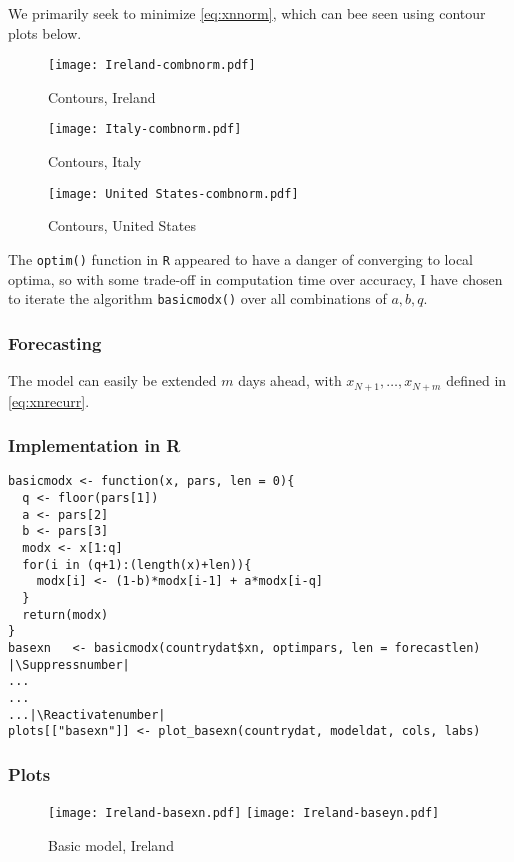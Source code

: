 We primarily seek to minimize \ref{eq:xnnorm}, which can bee seen using contour plots below.

\begin{figure}[H]
  \texttt{[image: Ireland-combnorm.pdf]} \label{fig:ireland-combnorm}
\caption{Contours, Ireland}
\endminipage\hfill
{}
  \texttt{[image: Italy-combnorm.pdf]} \label{fig:italy-combnorm}
\caption{Contours, Italy}
\endminipage\hfill
{}
  \texttt{[image: United States-combnorm.pdf]} \label{fig:usa-combnorm}
\caption{Contours, United States}
\endminipage\hfill
\end{figure}

The \verb|optim()| function in \verb|R| appeared to have a danger of converging to local optima, so with some trade-off in computation time over accuracy, I have chosen to iterate the algorithm \verb|basicmodx()| over all combinations of $a,b,q$.

\subsubsection{Forecasting}

The model can easily be extended $m$ days ahead, with $x_{N+1},\dots,x_{N+m}$ defined in  \ref{eq:xnrecurr}.

\subsubsection{Implementation in R}

\begin{lstlisting}[breaklines = true, escapeinside=||, tabsize = 4, caption = {Algorithm for Base Model}]
basicmodx <- function(x, pars, len = 0){
  q <- floor(pars[1])
  a <- pars[2]
  b <- pars[3]
  modx <- x[1:q]
  for(i in (q+1):(length(x)+len)){
    modx[i] <- (1-b)*modx[i-1] + a*modx[i-q]
  }
  return(modx)
}
basexn   <- basicmodx(countrydat$xn, optimpars, len = forecastlen)  |\Suppressnumber|
...
...
...|\Reactivatenumber|
plots[["basexn"]] <- plot_basexn(countrydat, modeldat, cols, labs)
\end{lstlisting}

\subsubsection{Plots}

\begin{figure}[H]
  \texttt{[image: Ireland-basexn.pdf]} \label{fig:ireland-basexn}
\endminipage\hfill
{}
  \texttt{[image: Ireland-baseyn.pdf]} \label{fig:ireland-baseyn}
\endminipage
\caption{Basic model, Ireland}
\end{figure}

